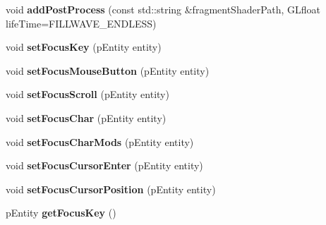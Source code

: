\begin{DoxyCompactItemize}
\item 
\hypertarget{classfillwave_1_1Engine_a73dd41624a311f1242ccddc4584f0ae2}{}void {\bfseries add\+Post\+Process} (const std\+::string \&fragment\+Shader\+Path, G\+Lfloat life\+Time=F\+I\+L\+L\+W\+A\+V\+E\+\_\+\+E\+N\+D\+L\+E\+S\+S)\label{classfillwave_1_1Engine_a73dd41624a311f1242ccddc4584f0ae2}

\item 
\hypertarget{classfillwave_1_1Engine_a27e7826505b51d009d13ab433b70e00b}{}void {\bfseries set\+Focus\+Key} (p\+Entity entity)\label{classfillwave_1_1Engine_a27e7826505b51d009d13ab433b70e00b}

\item 
\hypertarget{classfillwave_1_1Engine_a49d11248e32d308e024a13cf3c12982f}{}void {\bfseries set\+Focus\+Mouse\+Button} (p\+Entity entity)\label{classfillwave_1_1Engine_a49d11248e32d308e024a13cf3c12982f}

\item 
\hypertarget{classfillwave_1_1Engine_a83e437788bfb4743ae3e334ce3d847d4}{}void {\bfseries set\+Focus\+Scroll} (p\+Entity entity)\label{classfillwave_1_1Engine_a83e437788bfb4743ae3e334ce3d847d4}

\item 
\hypertarget{classfillwave_1_1Engine_ad85af270ea7c6a4ee06ff263d02b0f87}{}void {\bfseries set\+Focus\+Char} (p\+Entity entity)\label{classfillwave_1_1Engine_ad85af270ea7c6a4ee06ff263d02b0f87}

\item 
\hypertarget{classfillwave_1_1Engine_a58cf1ec7c9b31011cb3200c797f2719e}{}void {\bfseries set\+Focus\+Char\+Mods} (p\+Entity entity)\label{classfillwave_1_1Engine_a58cf1ec7c9b31011cb3200c797f2719e}

\item 
\hypertarget{classfillwave_1_1Engine_a0c474a1ea1c0704638cfcfd62de72f5f}{}void {\bfseries set\+Focus\+Cursor\+Enter} (p\+Entity entity)\label{classfillwave_1_1Engine_a0c474a1ea1c0704638cfcfd62de72f5f}

\item 
\hypertarget{classfillwave_1_1Engine_a9b81fd9dea4b2d0cb16dcfe1c5ba2705}{}void {\bfseries set\+Focus\+Cursor\+Position} (p\+Entity entity)\label{classfillwave_1_1Engine_a9b81fd9dea4b2d0cb16dcfe1c5ba2705}

\item 
\hypertarget{classfillwave_1_1Engine_a1669958a98cc9cb4f0bec033284a81dd}{}p\+Entity {\bfseries get\+Focus\+Key} ()\label{classfillwave_1_1Engine_a1669958a98cc9cb4f0bec033284a81dd}


\end{DoxyCompactItemize}
